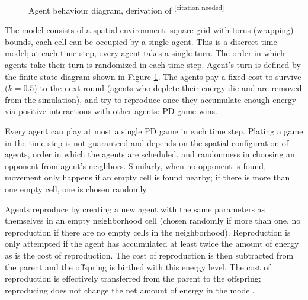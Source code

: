 \documentclass[english]{article}
\newcommand{\citationneeded}{\textsuperscript{\color{blue} [citation needed]}}
\begin{document}
\begin{figure}[h]
  \centering
  \caption{Agent behaviour diagram, derivation of \citationneeded}
  \label{fig:agent_behaviour}
\end{figure}

The model consists of a spatial environment:
square grid with torus (wrapping) bounds,
each cell can be occupied by a single agent.
This is a discreet time model;
at each time step, every agent takes a single turn.
The order in which agents take their turn is randomized in each time step.
Agent's turn is defined by the finite state diagram shown in Figure \ref{fig:agent_behaviour}.
The agents pay a fixed cost to survive ($k = 0.5$) to the next round (agents who deplete their energy die and are removed from the simulation), and try to reproduce once they accumulate enough energy via positive interactions with other agents: PD game wins.

Every agent can play at most a single PD game in each time step.
Plating a game in the time step is not guaranteed and depends on the spatial configuration of agents, order in which the agents are scheduled, and randomness in choosing an opponent from agent's neighbors.
Similarly, when no opponent is found, movement only happens if an empty cell is found nearby; if there is more than one empty cell, one is chosen randomly.

Agents reproduce by creating a new agent with the same parameters as themselves in an empty neighborhood cell (chosen randomly if more than one, no reproduction if there are no empty cells in the neighborhood).
Reproduction is only attempted if the agent has accumulated at least twice the amount of energy as is the cost of reproduction.
The cost of reproduction is then subtracted from the parent and the offspring is birthed with this energy level.
The cost of reproduction is effectively transferred from the parent to the offspring;
reproducing does not change the net amount of energy in the model.
\end{document}

